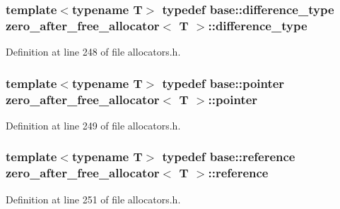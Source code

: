 \subsubsection[{difference\+\_\+type}]{\setlength{\rightskip}{0pt plus 5cm}template$<$typename T$>$ typedef base\+::difference\+\_\+type {\bf zero\+\_\+after\+\_\+free\+\_\+allocator}$<$ T $>$\+::{\bf difference\+\_\+type}}\label{structzero__after__free__allocator_ab45fc8fc90d403b3b44715616e167658}


Definition at line 248 of file allocators.\+h.

\hypertarget{structzero__after__free__allocator_a5cc395dbe16fe421abb6cdbcb96e06bd}{}
\subsubsection[{pointer}]{\setlength{\rightskip}{0pt plus 5cm}template$<$typename T$>$ typedef base\+::pointer {\bf zero\+\_\+after\+\_\+free\+\_\+allocator}$<$ T $>$\+::{\bf pointer}}\label{structzero__after__free__allocator_a5cc395dbe16fe421abb6cdbcb96e06bd}


Definition at line 249 of file allocators.\+h.

\hypertarget{structzero__after__free__allocator_a27e208c4c218d79cf0df9b524c674ddb}{}
\subsubsection[{reference}]{\setlength{\rightskip}{0pt plus 5cm}template$<$typename T$>$ typedef base\+::reference {\bf zero\+\_\+after\+\_\+free\+\_\+allocator}$<$ T $>$\+::{\bf reference}}\label{structzero__after__free__allocator_a27e208c4c218d79cf0df9b524c674ddb}


Definition at line 251 of file allocators.\+h.

\hypertarget{structzero__after__free__allocator_a85f5f3250c0519ea82ff33d980e73994}{}
